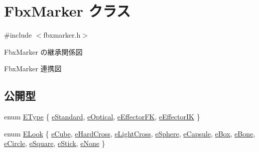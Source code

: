 \hypertarget{class_fbx_marker}{}\section{Fbx\+Marker クラス}
\label{class_fbx_marker}


{\ttfamily \#include $<$fbxmarker.\+h$>$}



Fbx\+Marker の継承関係図


Fbx\+Marker 連携図
\subsection*{公開型}
\begin{DoxyCompactItemize}
\item 
enum \hyperlink{class_fbx_marker_ad1e38753dce9a2212df0364466d9f617}{E\+Type} \{ \hyperlink{class_fbx_marker_ad1e38753dce9a2212df0364466d9f617aa1edb24a98a810e566746e0054959f24}{e\+Standard}, 
\hyperlink{class_fbx_marker_ad1e38753dce9a2212df0364466d9f617abcf28e7d0ad09666bdf9d31f6aa05654}{e\+Optical}, 
\hyperlink{class_fbx_marker_ad1e38753dce9a2212df0364466d9f617adc5085898df38077b0bddb3367fb7bb3}{e\+Effector\+FK}, 
\hyperlink{class_fbx_marker_ad1e38753dce9a2212df0364466d9f617a6eb5815d51c3fd66217211a2a4e70538}{e\+Effector\+IK}
 \}
\item 
enum \hyperlink{class_fbx_marker_a9e1fa9873c0d6da391d82d0de6a352c4}{E\+Look} \{ \newline
\hyperlink{class_fbx_marker_a9e1fa9873c0d6da391d82d0de6a352c4a2147a6da2652fbd99ab0b8d19c8c5b33}{e\+Cube}, 
\hyperlink{class_fbx_marker_a9e1fa9873c0d6da391d82d0de6a352c4a7cace07683e9c620c0e2aa9a240ea6ec}{e\+Hard\+Cross}, 
\hyperlink{class_fbx_marker_a9e1fa9873c0d6da391d82d0de6a352c4a1c90f7c1e7737e2385fe4aa64d91f574}{e\+Light\+Cross}, 
\hyperlink{class_fbx_marker_a9e1fa9873c0d6da391d82d0de6a352c4ad0bd12610ada9edf4a9403580cdb7fb6}{e\+Sphere}, 
\newline
\hyperlink{class_fbx_marker_a9e1fa9873c0d6da391d82d0de6a352c4a303b2f527ea7004d782a5225abe3f3f4}{e\+Capsule}, 
\hyperlink{class_fbx_marker_a9e1fa9873c0d6da391d82d0de6a352c4a35ce112da147a6ebf14bead2a9b6d200}{e\+Box}, 
\hyperlink{class_fbx_marker_a9e1fa9873c0d6da391d82d0de6a352c4a4601f19b8aace71fa0a4774e74269d30}{e\+Bone}, 
\hyperlink{class_fbx_marker_a9e1fa9873c0d6da391d82d0de6a352c4a49c65644845b421d09f27cfb4d53781d}{e\+Circle}, 
\newline
\hyperlink{class_fbx_marker_a9e1fa9873c0d6da391d82d0de6a352c4a4f18a89905ad8e7387cdd0c173c493f9}{e\+Square}, 
\hyperlink{class_fbx_marker_a9e1fa9873c0d6da391d82d0de6a352c4a0723dfa4c23a8f3eb7537e2f351af59e}{e\+Stick}, 
\hyperlink{class_fbx_marker_a9e1fa9873c0d6da391d82d0de6a352c4a7feeceed1082d4d37a8beb161014f049}{e\+None}
 \}
\end{DoxyCompactItemize}
